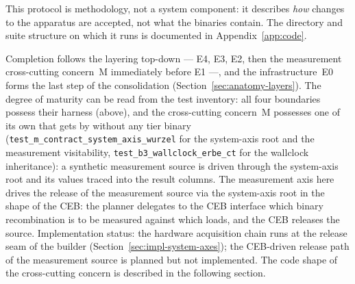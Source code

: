\begin{nurlang}
This protocol is methodology, not a system component: it describes \emph{how} changes to the apparatus
are accepted, not what the binaries contain. The directory and suite structure on which it runs is
documented in Appendix~\ref{app:code}.

Completion follows the layering top-down --- E4, E3, E2, then the measurement cross-cutting concern~M
immediately before E1 ---, and the infrastructure~E0 forms the last step of the consolidation
(Section~\ref{sec:anatomy-layers}). The degree of maturity can be read from the test inventory: all
four boundaries possess their harness (above), and the cross-cutting concern~M possesses one of its own
that gets by without any tier binary
(\texttt{test\_\allowbreak{}m\_\allowbreak{}contract\_\allowbreak{}system\_\allowbreak{}axis\_\allowbreak{}wurzel}
for the system-axis root and the measurement visitability,
\texttt{test\_\allowbreak{}b3\_\allowbreak{}wallclock\_\allowbreak{}erbe\_\allowbreak{}ct} for the
wallclock inheritance): a synthetic measurement source is driven through the system-axis root and its
values traced into the result columns. The measurement axis here drives the release of the measurement
source via the system-axis root in the shape of the CEB\@: the planner delegates to the CEB interface
which binary recombination is to be measured against which loads, and the CEB releases the source.
Implementation status: the hardware acquisition chain runs at the release seam of the builder
(Section~\ref{sec:impl-system-axes}); the CEB-driven release path of the measurement source is planned
but not implemented. The code shape of the cross-cutting concern is described in the following section.
\end{nurlang}
